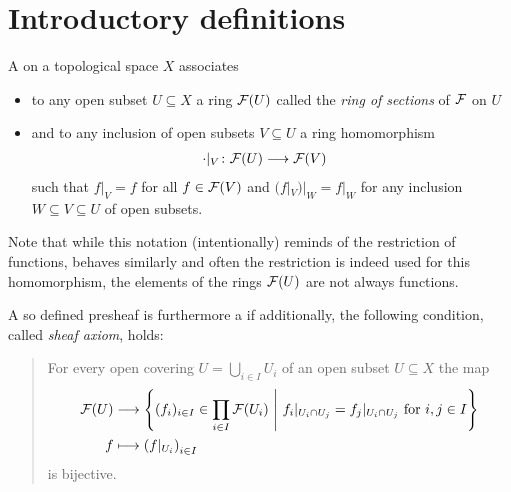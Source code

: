 \documentclass[a4paper,parskip=half,numbers=enddot, DIV=12]{scrreprt}
\begin{document}
\section{Introductory definitions}
\begin{defi}
    A  on a topological space $X$ associates 
    \begin{itemize}
    	\item to any open subset $U\subseteq X$ a ring $\mathcal{F}(U)$ called the \emph{ring of sections} of $\mathcal{F}$ on $U$
    	\item and to any inclusion of open subsets $V\subseteq U$ a ring homomorphism 
    	\begin{align*}
	    	\cdot|_V\colon \mathcal{F}(U) &\longrightarrow \mathcal{F}(V)
    	\end{align*}
    	such that $f|_V = f$ for all $f\in\mathcal{F}(V)$ and $(f|_V)|_W = f|_W$ for any inclusion $W\subseteq V\subseteq U$ of open subsets.
    \end{itemize}  Note that while this notation (intentionally) reminds of the restriction of functions, behaves similarly and often the restriction is indeed used for this homomorphism, the elements of the rings $\mathcal{F}(U)$ are not always functions. 
    
    A so defined presheaf is furthermore a  if additionally, the following condition, called \emph{sheaf axiom}, holds:
    \begin{quote}
     For every open covering $U = \bigcup_{i\in I} U_i$ of an open subset $U\subseteq X$ the map
        \begin{align*}
			\mathcal{F}(U) &\longrightarrow \left\{(f_i)_{i\in I}\in \prod_{i\in I} \mathcal{F} (U_i)\ \middle|\  f_i|_{U_i\cap U_j} = f_j|_{U_i\cap U_j} \text{ for }i,j\in I\right\}\\
			f &\longmapsto \left(f|_{U_i}\right)_{i\in I}
        \end{align*}
        is bijective. 
    \end{quote}
\end{defi}
\end{document}
